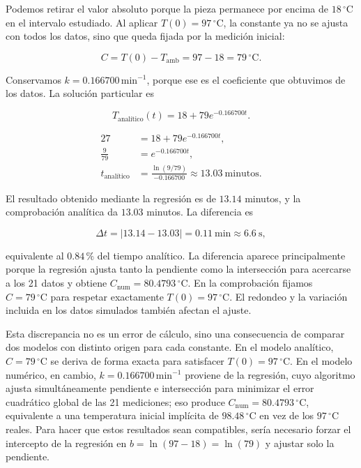 \documentclass[11pt,onecolumn,letterpaper]{article}
\newcommand{\Tamb}{T_{\mathrm{amb}}}
\begin{document}
Podemos retirar el valor absoluto porque la pieza permanece por encima de \(18\,^{\circ}\mathrm{C}\) en el intervalo estudiado. Al aplicar \(T(0)=97\,^{\circ}\mathrm{C}\), la constante ya no se ajusta con todos los datos, sino que queda fijada por la medición inicial:

\begin{equation*}
    C=T(0)-\Tamb=97-18=79\,^{\circ}\mathrm{C}.
\end{equation*}

Conservamos \(k=0.166700\,\mathrm{min}^{-1}\), porque ese es el coeficiente que obtuvimos de los datos. La solución particular es

\begin{equation}
    \boxed{T_{\text{analítico}}(t)=18+79e^{-0.166700t}}.
    \label{eq:modelo-analitico}
\end{equation}

\begin{align*}
    27 &= 18+79e^{-0.166700t}, \\
    \frac{9}{79} &= e^{-0.166700t}, \\
    t_{\text{analítico}}
       &=\frac{\ln(9/79)}{-0.166700}
       \approx 13.03\ \text{minutos}.
\end{align*}

El resultado obtenido mediante la regresión es de \(13.14\) minutos, y la comprobación analítica da \(13.03\) minutos. La diferencia es

\begin{equation*}
    \Delta t=|13.14-13.03|=0.11\ \text{min}\approx6.6\ \text{s},
\end{equation*}

equivalente al \(0.84\,\%\) del tiempo analítico. La diferencia aparece principalmente porque la regresión ajusta tanto la pendiente como la intersección para acercarse a los 21 datos y obtiene \(C_{\mathrm{num}}=80.4793\,^{\circ}\mathrm{C}\). En la comprobación fijamos \(C=79\,^{\circ}\mathrm{C}\) para respetar exactamente \(T(0)=97\,^{\circ}\mathrm{C}\). El redondeo y la variación incluida en los datos simulados también afectan el ajuste.

Esta discrepancia no es un error de cálculo, sino una consecuencia de comparar dos modelos con distinto origen para cada constante. En el modelo analítico, \(C=79\,^{\circ}\mathrm{C}\) se deriva de forma exacta para satisfacer \(T(0)=97\,^{\circ}\mathrm{C}\). En el modelo numérico, en cambio, \(k=0.166700\,\mathrm{min}^{-1}\) proviene de la regresión, cuyo algoritmo ajusta simultáneamente pendiente e intersección para minimizar el error cuadrático global de las 21 mediciones; eso produce \(C_{\mathrm{num}}=80.4793\,^{\circ}\mathrm{C}\), equivalente a una temperatura inicial implícita de \(98.48\,^{\circ}\mathrm{C}\) en vez de los \(97\,^{\circ}\mathrm{C}\) reales. Para hacer que estos resultados sean compatibles, sería necesario forzar el intercepto de la regresión en \(b=\ln(97-18)=\ln(79)\) y ajustar solo la pendiente.
\end{document}
